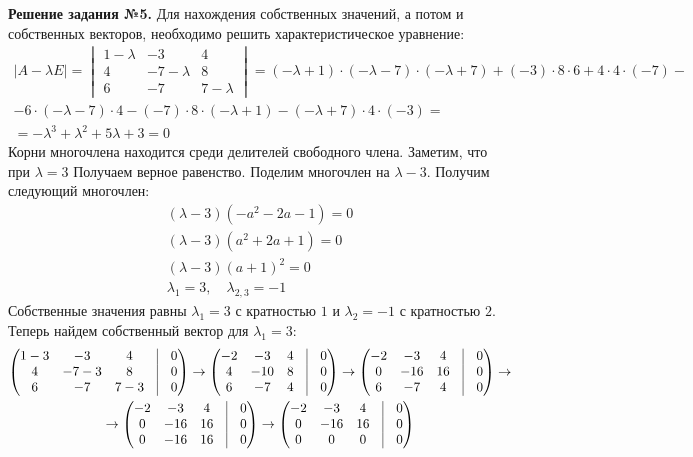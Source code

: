 \documentclass[a4paper, 12pt]{article}
\begin{document}
\textbf{Решение задания №5.} Для нахождения собственных значений, а потом и собственных векторов, необходимо решить характеристическое уравнение:
\begin{gather*}
    |A - \lambda E| = 
    \begin{vmatrix}
        1 - \lambda & -3 & 4 \\ 
        4 & -7 - \lambda & 8 \\ 
        6 & -7 & 7 - \lambda
    \end{vmatrix} = (-\lambda+1)\cdot(-\lambda-7)\cdot(-\lambda+7)+(-3)\cdot8\cdot6+4\cdot4\cdot(-7)- \\ 
    -6\cdot(-\lambda-7)\cdot4-(-7)\cdot8\cdot(-\lambda+1)-(-\lambda+7)\cdot4\cdot(-3) = \\
    = -\lambda^3+\lambda^2+5\lambda +3 = 0
\end{gather*}
Корни многочлена находится среди делителей свободного члена. Заметим, что при $\lambda=3$ Получаем верное равенство. Поделим многочлен на $\lambda-3$. Получим следующий многочлен:
\begin{gather*}
    (\lambda - 3)(-a^2 -2a -1) = 0 \\ 
    (\lambda - 3)(a^2 +2a +1) = 0 \\
    (\lambda - 3)(a+1)^2 = 0 \\ 
    \lambda_1 = 3, \quad \lambda_{2,3} = -1
\end{gather*}
Собственные значения равны $\lambda_1 = 3$ с кратностью $1$ и $\lambda_2 = -1$ с кратностью $2$. Теперь найдем собственный вектор для $\lambda_1 = 3$:
\begin{gather*}
    \begin{pmatrix}
        1 - 3 & -3 & 4 & \vrule & 0 \\ 
        4 & -7 - 3 & 8 & \vrule & 0 \\ 
        6 & -7 & 7 - 3 & \vrule & 0
    \end{pmatrix} \rightarrow
    \begin{pmatrix}
        -2 & -3 & 4 & \vrule & 0 \\ 
        4 & -10 & 8 & \vrule & 0 \\ 
        6 & -7 & 4 & \vrule & 0
    \end{pmatrix} \rightarrow
    \begin{pmatrix}
        -2 & -3 & 4 & \vrule & 0 \\
        0 & -16 & 16 & \vrule & 0 \\
        6 & -7 & 4 & \vrule & 0
    \end{pmatrix} \rightarrow \\ \rightarrow  
    \begin{pmatrix}
        -2 & -3 & 4 & \vrule & 0 \\
        0 & -16 & 16 & \vrule & 0 \\
        0 & -16 & 16 & \vrule & 0
    \end{pmatrix} \rightarrow
    \begin{pmatrix}
        -2 & -3 & 4 & \vrule & 0 \\
        0 & -16 & 16 & \vrule & 0 \\
        0 & 0 & 0 & \vrule & 0
    \end{pmatrix}
\end{gather*}
\end{document}

